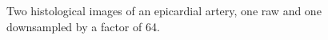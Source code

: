       \begin{figure}[htbp]
        \centering
        \caption{Two histological images of an epicardial artery, one raw and one downsampled by a factor of 64.}
        \label{fig:downsampled_vessel}
      \end{figure}
      
